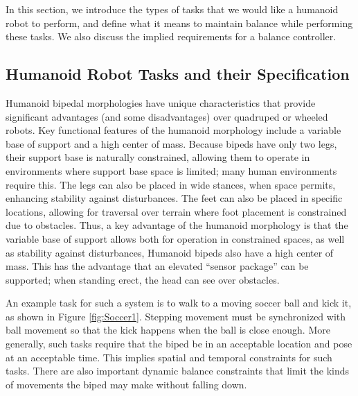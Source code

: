 \documentclass{llncs}
\renewcommand{\section}[1]{\vspace{0.1in}\noindent{\large\bf{#1}}\par\vspace{.05in}\par\nopagebreak}
\begin{document}
\section{Control Problem Statement}
\label{sec:problemstatement}

In this section, we introduce the types of tasks that we would like a humanoid robot to perform, and define what it means to maintain
balance while performing these tasks.  We also discuss the implied requirements for a balance controller.


\subsection{Humanoid Robot Tasks and their Specification}

Humanoid bipedal morphologies have unique characteristics that provide significant advantages (and some disadvantages) over quadruped or wheeled robots. 
Key functional features of the humanoid morphology include a variable base of support and a high center of mass.
Because bipeds have only two legs, their support base is naturally constrained, allowing them to operate in environments where support base space is limited; 
many human environments require this. 
The legs can also be placed in wide stances, when space permits, enhancing stability against disturbances.
The feet can also be placed in specific locations, allowing for traversal over terrain where foot placement is constrained due to obstacles.
Thus, a key advantage of the humanoid morphology is that the variable base of support allows both for operation in constrained spaces, 
as well as stability against disturbances, 
Humanoid bipeds also have a high center of mass.  
This has the advantage that an elevated ``sensor package'' can be supported; when standing erect, the head can see over obstacles. 

An example task for such a system is to walk to a moving soccer ball and kick it, as shown in Figure \ref{fig:Soccer1}.  
Stepping movement must be synchronized with ball movement so that the kick happens when the ball is close enough.  
More generally, such tasks require that the biped be in an acceptable location and pose at an acceptable time.  
This implies spatial and temporal constraints for such tasks.  
There are also important dynamic balance constraints that limit the kinds of movements the biped may make without falling down.
\end{document}

